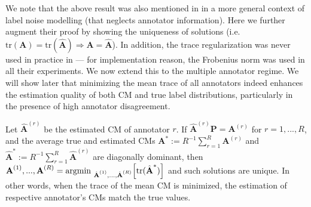 We note that the above result was also mentioned in \cite{sukhbaatar2014training} in a more general context of label noise modelling (that neglects annotator information). Here we further augment their proof by showing the uniqueness of solutions (i.e.  $\text{tr}(\textbf{A})= \text{tr}(\hat{\textbf{A}})	\Rightarrow \textbf{A} = \hat{\textbf{A}}$). In addition, the trace regularization was never used in practice in \cite{sukhbaatar2014training} --- for implementation reason, the Frobenius norm was used in all their experiments.  We now extend this to the multiple annotator regime. We will show later that minimizing the mean trace of all annotators indeed enhances the estimation quality of both CM and true label distributions, particularly in the presence of high annotator disagreement. 

\begin{theorem}\label{theorem:main}
Let $\hat{\textbf{A}}^{(r)}$ be the estimated CM of annotator $r$. If $\hat{\textbf{A}}^{(r)}\textbf{P}=\textbf{A}^{(r)}$ for $r=1,...,R$, and the average true and estimated CMs $\textbf{A}^{*}:=R^{-1}\sum_{r=1}^R\textbf{A}^{(r)}$ and $\hat{\textbf{A}}^{*}:=R^{-1}\sum_{r=1}^R\hat{\textbf{A}}^{(r)}$ are diagonally dominant, then  $\textbf{A}^{(1)}, ..., \textbf{A}^{(R)} = \text{argmin }_{\hat{\textbf{A}}^{(1)}, ..., \hat{\textbf{A}}^{(R)}}\Big{[}\text{tr}(\hat{\textbf{A}}^{*})\Big{]}$ and such solutions are unique. In other words, when the trace of the mean CM is minimized, the estimation of respective annotator's CMs match the true values. 
\end{theorem}

